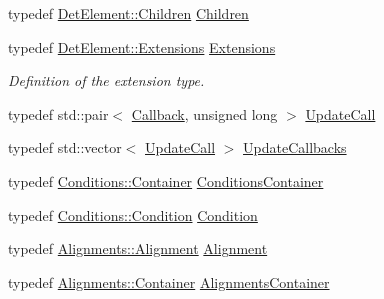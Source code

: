 \begin{DoxyCompactItemize}
typedef \hyperlink{class_d_d4hep_1_1_geometry_1_1_det_element_afc41f63ac2a467f5077d1cca1292d580}{DetElement::Children} \hyperlink{class_d_d4hep_1_1_geometry_1_1_det_element_object_aaf04a1f51d7a7ce4c0e0dc4863268d8a}{Children}
\item 
typedef \hyperlink{class_d_d4hep_1_1_geometry_1_1_det_element_aa3651ed4a11789675607a06d2f6846ff}{DetElement::Extensions} \hyperlink{class_d_d4hep_1_1_geometry_1_1_det_element_object_ac74df66a49fc20d985f033a063b7dbab}{Extensions}
\begin{DoxyCompactList}\small\item\em Definition of the extension type. \item\end{DoxyCompactList}\item 
typedef std::pair$<$ \hyperlink{class_d_d4hep_1_1_callback}{Callback}, unsigned long $>$ \hyperlink{class_d_d4hep_1_1_geometry_1_1_det_element_object_a3b316c36c1b168152e4c96a42ca561aa}{UpdateCall}
\item 
typedef std::vector$<$ \hyperlink{class_d_d4hep_1_1_geometry_1_1_det_element_object_a3b316c36c1b168152e4c96a42ca561aa}{UpdateCall} $>$ \hyperlink{class_d_d4hep_1_1_geometry_1_1_det_element_object_aa3bda3e351cc13f5bcce906a67d21872}{UpdateCallbacks}
\item 
typedef \hyperlink{class_d_d4hep_1_1_conditions_1_1_container}{Conditions::Container} \hyperlink{class_d_d4hep_1_1_geometry_1_1_det_element_object_a01728952c7dd2f2c102e2a1ae25b80ff}{ConditionsContainer}
\item 
typedef \hyperlink{class_d_d4hep_1_1_conditions_1_1_condition}{Conditions::Condition} \hyperlink{class_d_d4hep_1_1_geometry_1_1_det_element_object_ad16c1a834041ed152dee870f1ec346da}{Condition}
\item 
typedef \hyperlink{class_d_d4hep_1_1_alignments_1_1_alignment}{Alignments::Alignment} \hyperlink{class_d_d4hep_1_1_geometry_1_1_det_element_object_aaf1bb49d0e1799f548f775b35e3cb590}{Alignment}
\item 
typedef \hyperlink{class_d_d4hep_1_1_alignments_1_1_container}{Alignments::Container} \hyperlink{class_d_d4hep_1_1_geometry_1_1_det_element_object_ab920e3c690de8d093cb556b0d3c87ce8}{AlignmentsContainer}
\end{DoxyCompactItemize}
